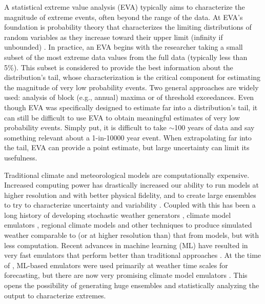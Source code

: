 \documentclass{ametsocV6.1}
\begin{document}
A statistical extreme value analysis (EVA) typically aims to characterize the magnitude of extreme events, often beyond the range of the data.
At EVA's foundation is probability theory that characterizes the limiting distributions of random variables as they increase toward their upper limit (infinity if unbounded) \citep{coles2001introduction}.
In practice, an EVA begins with the researcher taking a small subset of the most extreme data values from the full data (typically less than 5\%). This subset is considered to provide the best information about the distribution's tail, whose characterization is the critical component for estimating the magnitude of very low probability events. 
Two general approaches are widely used: analysis of block (e.g., annual) maxima or of threshold exceedances. %
Even though EVA was specifically designed to estimate far into a distribution's tail, 
it can still be difficult to use EVA to obtain meaningful estimates of very low probability events.
Simply put, it is difficult to take $\sim$100 years of data and say something relevant about a 1-in-10000 year event. 
When extrapolating far into the tail, EVA can provide a point estimate, but large uncertainty can limit its usefulness.


Traditional climate and meteorological models are computationally expensive. Increased computing power has drastically increased our ability to run models at higher resolution and with better physical fidelity, and to create large ensembles to try to characterize uncertainty and variability \citep{FlatoEtAl2013,nasem2024pmp}. Coupled with this has been a long history of developing stochastic weather generators \citep{ailliot2015stochastic}, climate model emulators \citep{tebaldi2025emulators}, regional climate models \citep{giorgi2019thirty} and other techniques to produce simulated weather comparable to (or at higher resolution than) that from models, but with less computation. Recent advances in machine learning (ML) have resulted in very fast emulators that perform better than traditional approaches \citep{bi2023accurate,lam2023learning,price2025probabilistic}. At the time of \citet{nasem2024pmp}, ML-based emulators were used primarily at weather time scales for forecasting, but there are now very promising climate model emulators \citep{chapman2025camulator,cresswell2024deep,watt2025ace2}. This opens the possibility of generating huge ensembles and statistically analyzing the output to characterize extremes. 
\end{document}
